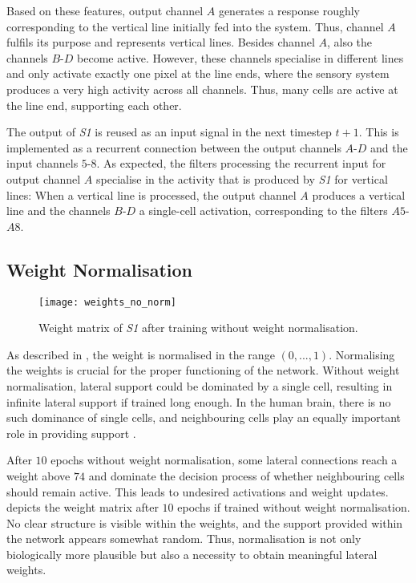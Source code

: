 Based on these features, output channel $A$ generates a response roughly corresponding to the vertical line initially fed into the system.
Thus, channel $A$ fulfils its purpose and represents vertical lines.
Besides channel $A$, also the channels $B$-$D$ become active.
However, these channels specialise in different lines and only activate exactly one pixel at the line ends, where the sensory system produces a very high activity across all channels.
Thus, many cells are active at the line end, supporting each other.

The output of \emph{S1} is reused as an input signal in the next timestep $t+1$.
This is implemented as a recurrent connection between the output channels $A$-$D$ and the input channels $5$-$8$.
As expected, the filters processing the recurrent input for output channel $A$ specialise in the activity that is produced by \emph{S1} for vertical lines:
When a vertical line is processed, the output channel $A$ produces a vertical line and the channels $B$-$D$ a single-cell activation, corresponding to the filters $A5$-$A8$.


\subsection{Weight Normalisation}
%
\begin{figure}[h]
    \centering
    \texttt{[image: weights\_no\_norm]}
    \caption[Weights after training without normalisation]{Weight matrix of \emph{S1} after training without weight normalisation.}
\end{figure}
%
As described in , the weight is normalised in the range $(0, ..., 1)$.
Normalising the weights is crucial for the proper functioning of the network. Without weight normalisation, lateral support could be dominated by a single cell, resulting in infinite lateral support if trained long enough. In the human brain, there is no such dominance of single cells, and neighbouring cells play an equally important role in providing support .

After $10$ epochs without weight normalisation, some lateral connections reach a weight above $74$ and dominate the decision process of whether neighbouring cells should remain active.
This leads to undesired activations and weight updates. 
 depicts the weight matrix after $10$ epochs if trained without weight normalisation.
No clear structure is visible within the weights, and the support provided within the network appears somewhat random. 
Thus, normalisation is not only biologically more plausible but also a necessity to obtain meaningful lateral weights.



